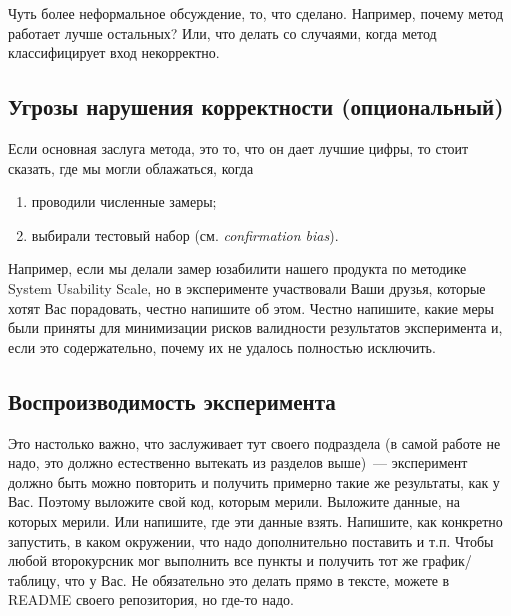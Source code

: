 Чуть более неформальное обсуждение, то, что сделано.
Например, почему метод работает лучше остальных?
Или, что делать со случаями, когда метод классифицирует вход некорректно.

\subsection{Угрозы нарушения корректности (опциональный)}

Если основная заслуга метода, это то, что он дает лучшие цифры, то стоит сказать, где мы могли облажаться, когда
\begin{enumerate}
    \item проводили численные замеры;
    \item выбирали тестовый набор (см. \emph{confirmation bias}).
\end{enumerate}

Например, если мы делали замер юзабилити нашего продукта по методике System Usability Scale, но в эксперименте участвовали Ваши друзья, которые хотят Вас порадовать, честно напишите об этом.
Честно напишите, какие меры были приняты для минимизации рисков валидности результатов эксперимента и, если это содержательно, почему их не удалось полностью исключить.

\subsection{Воспроизводимость эксперимента}

Это настолько важно, что заслуживает тут своего подраздела (в самой работе не надо, это должно естественно вытекать из разделов выше)~--- эксперимент должно быть можно повторить и получить примерно такие же результаты, как у Вас.
Поэтому выложите свой код, которым мерили.
Выложите данные, на которых мерили.
Или напишите, где эти данные взять.
Напишите, как конкретно запустить, в каком окружении, что надо дополнительно поставить и т.п.
Чтобы любой второкурсник мог выполнить все пункты и получить тот же график/таблицу, что у Вас.
Не обязательно это делать прямо в тексте, можете в README своего репозитория, но где-то надо.

